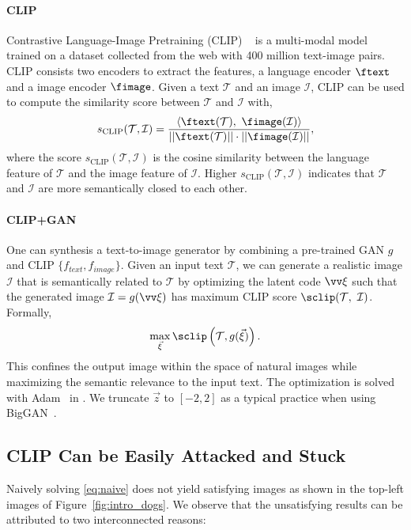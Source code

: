 \documentclass[10pt,twocolumn,letterpaper]{article}
\newcommand{\ganclip}{CLIP+GAN}
\begin{document}
\paragraph{CLIP} 
Contrastive Language-Image Pretraining (CLIP) ~\cite{radford2021learning} is a multi-modal model trained on a dataset collected from the web with 400 million text-image pairs. CLIP consists two encoders to extract the features, a language encoder $\ftext$ and a image encoder $\fimage$. Given a text $\mathcal{T}$ and an image $\mathcal I$, CLIP can be used to compute the similarity score between $\mathcal{T}$ and $\mathcal I$ with,
\begin{equation}
    s_{\text{CLIP}}(\mathcal{T}, \mathcal{I}) = \frac{\left < \ftext(\mathcal{T}),~\fimage(\mathcal{I}) \right >}{||\ftext(\mathcal{T})||\cdot||\fimage(\mathcal{I})||},
\end{equation}
where the score $s_{\text{CLIP}}(\mathcal{T}, \mathcal{I})$ is the cosine similarity between the language feature of $\mathcal{T}$ and the image feature of $\mathcal{I}$.
Higher $s_{\text{CLIP}}(\mathcal{T}, \mathcal{I})$ indicates that $\mathcal{T}$ and $\mathcal{I}$ are more semantically closed to each other. 
\fi  

\paragraph{\ganclip}
One can synthesis a text-to-image generator by 
combining a pre-trained GAN $g$ and CLIP $
\{f_{text}, f_{image}\}$. 
Given an input text $\mathcal{T}$, 
we can generate a realistic image $\mathcal I$ that is semantically related to $\mathcal T$ by optimizing the latent code $\vv \xi$ such that the generated image $\mathcal I = g(\vv \xi)$ has maximum CLIP score $\sclip(\mathcal T, ~ \mathcal I)$. Formally, 
\begin{equation}
\label{eq:naive}
\max_{\vec \xi}  
    \sclip\left (\mathcal{T}, g(\vec \xi) \right ).
\end{equation}
This confines the output image within the space of natural images 
while maximizing the semantic relevance to the input text. 
The optimization is 
solved with Adam~\cite{kingma2015adam} in \cite{zhu2016generative, bigsleep}. We truncate $\vec z$ to $[-2, 2]$ as a typical practice when using BigGAN~\cite{brock2018large, huh2020transforming}. 


\subsection{CLIP Can be Easily Attacked and Stuck}  Naively solving \eqref{eq:naive} does not yield 
satisfying images
as shown in the top-left images of Figure~\ref{fig:intro_dogs}. 
We observe that the unsatisfying results  
can be attributed to two interconnected reasons:  
\end{document}
